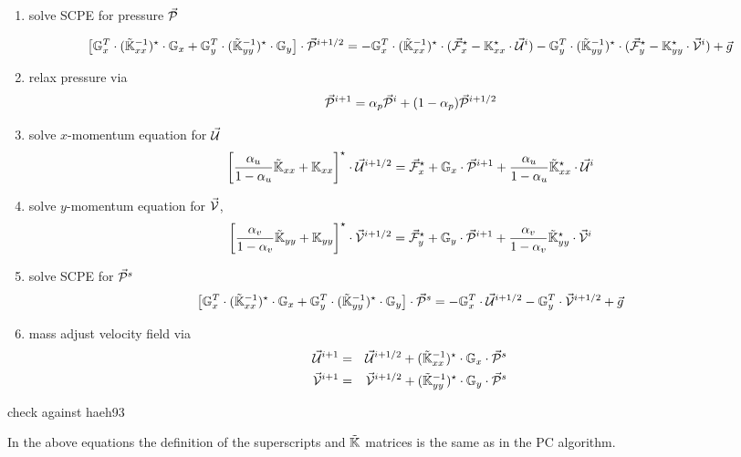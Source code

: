 \documentclass[a4paper,12pt]{article}
\begin{document}
\begin{enumerate}
\item solve SCPE for pressure $\vec{\cal P}$ 

\[
\left[
{\mathbb{G}}_x^T \cdot ( \tilde{{\mathbb{K}}}_{xx}^{-1})^\star \cdot {\mathbb{G}}_x
+
{\mathbb{G}}_y^T \cdot ( \tilde{{\mathbb{K}}}_{yy}^{-1})^\star \cdot {\mathbb{G}}_y
\right]
\cdot
\vec{\cal P}^{i+1/2} 
= -{\mathbb{G}}_x^T \cdot (\tilde{{\mathbb{K}}}_{xx}^{-1})^\star \cdot 
(\vec{\cal F}_x^\star - {\mathbb{K}}_{xx}^\star \cdot \vec{\cal U}^i)
  -{\mathbb{G}}_y^T \cdot (\tilde{{\mathbb{K}}}_{yy}^{-1})^\star \cdot 
(\vec{\cal F}_y^\star - {\mathbb{K}}_{yy}^\star \cdot \vec{\cal V}^i)
+ \vec{g} 
\]

\item relax pressure via
\[
\vec{\cal P}^{i+1} = \alpha_p \vec{\cal P}^i + (1-\alpha_p) \vec{\cal P}^{i+1/2}
\]

\item solve $x$-momentum equation for $\vec{\cal U}$
\[
\left[
\frac{\alpha_u}{1-\alpha_u} \tilde{{\mathbb{K}}}_{xx} + {\mathbb{K}}_{xx}
\right]^\star
\cdot
\vec{\cal U}^{i+1/2} = \vec{\cal F}_x^\star + {\mathbb{G}}_x \cdot \vec{\cal P}^{i+1}
+\frac{\alpha_u}{1-\alpha_u} \tilde{{\mathbb{K}}}_{xx}^\star\cdot \vec{\cal U}^{i}
\]

\item solve $y$-momentum equation for $\vec{\cal V}$,
\[
\left[
\frac{\alpha_v}{1-\alpha_v} \tilde{{\mathbb{K}}}_{yy} + {\mathbb{K}}_{yy}
\right]^\star
\cdot
\vec{\cal V}^{i+1/2} = \vec{\cal F}_y^\star + {\mathbb{G}}_y \cdot \vec{\cal P}^{i+1}
+\frac{\alpha_v}{1-\alpha_v} \tilde{{\mathbb{K}}}_{yy}^\star\cdot \vec{\cal V}^{i}
\]

\item solve SCPE for $\vec{\cal P}^s$
\[
\left[
{\mathbb{G}}_x^T \cdot ( \tilde{{\mathbb{K}}}_{xx}^{-1})^\star \cdot {\mathbb{G}}_x
+
{\mathbb{G}}_y^T \cdot ( \tilde{{\mathbb{K}}}_{yy}^{-1})^\star \cdot {\mathbb{G}}_y
\right]
\cdot
\vec{\cal P}^{s} 
= -{\mathbb{G}}_x^T \cdot \vec{\cal U}^{i+1/2} - {\mathbb{G}}_y^T \cdot \vec{\cal V}^{i+1/2} + \vec{g} 
\]

\item mass adjust velocity field via
\begin{eqnarray}
\vec{\cal U}^{i+1} &=& \vec{\cal U}^{i+1/2} 
+ (\tilde{{\mathbb{K}}}_{xx}^{-1})^\star \cdot {\mathbb{G}}_x \cdot \vec{\cal P}^s \\
\vec{\cal V}^{i+1} &=& \vec{\cal V}^{i+1/2} 
+ (\tilde{{\mathbb{K}}}_{yy}^{-1})^\star \cdot {\mathbb{G}}_y \cdot \vec{\cal P}^s 
\end{eqnarray}
\end{enumerate}

{\color{red} check against haeh93}


In the above equations the definition of the superscripts and 
$\tilde{{\mathbb{K}}}$ matrices is the same as in the PC algorithm.
\end{document}
